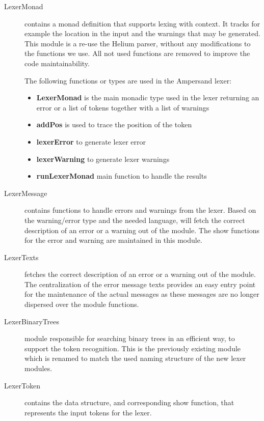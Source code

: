  \begin{description}
 
    \item[LexerMonad] contains a monad definition that supports lexing with context.
      It tracks for example the location in the input and the warnings that may be generated.
      This module is a re-use the  Helium parser, without any modifications to the functions we use.
      All not used functions are removed to improve the code maintainability.
      
      The following functions or types are used in the Ampersand lexer:
	  \begin{itemize}
		\item \textbf{LexerMonad} is the main monadic type used in the lexer returning an error or a list of tokens together with a list of warnings
		\item \textbf{addPos} is used to trace the position of the token
		\item \textbf{lexerError} to generate lexer error
		\item \textbf{lexerWarning} to generate lexer warnings
		\item \textbf{runLexerMonad} main function to handle the  results 
	  \end{itemize}
	  
    \item[LexerMessage] contains functions to handle errors and warnings from the lexer.
	  Based on the warning/error type and the needed language,  will fetch the correct description of an error or a warning out of the  module.
	  The show functions for the error and warning are maintained in this module.
	  
    \item[LexerTexts] fetches the correct description of an error or a warning out of the  module.
	  The centralization of the error message texts provides an easy entry point for the maintenance of the actual messages as these messages are no longer dispersed over the module functions.
	  
    \item[LexerBinaryTrees] module responsible for searching binary trees in an efficient way, to support the token recognition.
    This is the previously existing  module which is renamed to match the used naming structure of the new lexer modules.

    \item[LexerToken] contains the data structure, and corresponding show function, that represents the input tokens for the lexer.
	
  \end{description}


